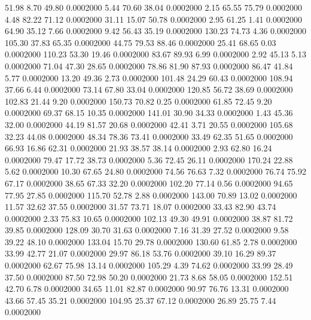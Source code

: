   51.98    8.70   49.80   0.0002000
   5.44   70.60   38.04   0.0002000
   2.15   65.55   75.79   0.0002000
   4.48   82.22   71.12   0.0002000
  31.11   15.07   50.78   0.0002000
   2.95   61.25    1.41   0.0002000
  64.90   35.12    7.66   0.0002000
   9.42   56.43   35.19   0.0002000
 130.23   74.73    4.36   0.0002000
 105.30   37.83   65.35   0.0002000
  44.75   79.53   88.46   0.0002000
  25.41   68.65    0.03   0.0002000
 110.23   53.30   19.46   0.0002000
  83.67   89.93    6.99   0.0002000
   2.92   45.13    5.13   0.0002000
  71.04   47.30   28.65   0.0002000
  78.86   81.90   87.93   0.0002000
  86.47   41.84    5.77   0.0002000
  13.20   49.36    2.73   0.0002000
 101.48   24.29   60.43   0.0002000
 108.94   37.66    6.44   0.0002000
  73.14   67.80   33.04   0.0002000
 120.85   56.72   38.69   0.0002000
 102.83   21.44    9.20   0.0002000
 150.73   70.82    0.25   0.0002000
  61.85   72.45    9.20   0.0002000
  69.37   68.15   10.35   0.0002000
 141.01   30.90   34.33   0.0002000
   1.43   45.36   32.00   0.0002000
  44.19   81.57   20.68   0.0002000
  42.41    3.71   20.55   0.0002000
 105.68   32.23   44.08   0.0002000
  48.34   78.36   73.41   0.0002000
  33.49   62.35   51.65   0.0002000
  66.93   16.86   62.31   0.0002000
  21.93   38.57   38.14   0.0002000
   2.93   62.80   16.24   0.0002000
  79.47   17.72   38.73   0.0002000
   5.36   72.45   26.11   0.0002000
 170.24   22.88    5.62   0.0002000
  10.30   67.65   24.80   0.0002000
  74.56   76.63    7.32   0.0002000
  76.74   75.92   67.17   0.0002000
  38.65   67.33   32.20   0.0002000
 102.20   77.14    0.56   0.0002000
  94.65   77.95   27.85   0.0002000
 115.70   52.78    2.88   0.0002000
 143.00   70.89   13.02   0.0002000
  11.57   32.62   37.55   0.0002000
  31.57   73.71   18.07   0.0002000
  33.43   82.90   43.74   0.0002000
   2.33   75.83   10.65   0.0002000
 102.13   49.30   49.91   0.0002000
  38.87   81.72   39.85   0.0002000
 128.09   30.70   31.63   0.0002000
   7.16   31.39   27.52   0.0002000
   9.58   39.22   48.10   0.0002000
 133.04   15.70   29.78   0.0002000
 130.60   61.85    2.78   0.0002000
  33.99   42.77   21.07   0.0002000
  29.97   86.18   53.76   0.0002000
  39.10   16.29   89.37   0.0002000
  62.67   75.98   13.14   0.0002000
 105.29    4.39   74.62   0.0002000
  33.99   28.49   37.50   0.0002000
  87.50   72.98   50.20   0.0002000
  21.73    8.68   58.05   0.0002000
 152.51   42.70    6.78   0.0002000
  34.65   11.01   82.87   0.0002000
  90.97   76.76   13.31   0.0002000
  43.66   57.45   35.21   0.0002000
 104.95   25.37   67.12   0.0002000
  26.89   25.75    7.44   0.0002000

